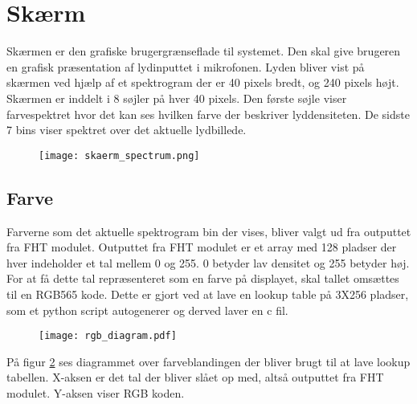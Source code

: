



\section{Skærm}
Skærmen er den grafiske brugergrænseflade til systemet. Den skal give brugeren en grafisk præsentation af lydinputtet i mikrofonen. Lyden bliver vist på skærmen ved hjælp af et spektrogram der er 40 pixels bredt, og 240 pixels højt.
Skærmen er inddelt i 8 søjler på hver 40 pixels. Den første søjle viser farvespektret hvor det kan ses hvilken farve der beskriver lyddensiteten. De sidste 7 bins viser spektret over det aktuelle lydbillede.

\begin{figure} [H]
	\centering
	\texttt{[image: skaerm\_spectrum.png]}
	\label{fig:skaerm_spectrum}
\end{figure}

\subsection{Farve}
Farverne som det aktuelle spektrogram bin der vises, bliver valgt ud fra outputtet fra FHT modulet. Outputtet fra FHT modulet er et array med 128 pladser der hver indeholder et tal mellem 0 og 255. 0 betyder lav densitet og 255 betyder høj.
For at få dette tal repræsenteret som en farve på displayet, skal tallet omsættes til en RGB565 kode.
Dette er gjort ved at lave en lookup table på 3X256 pladser, som et python script autogenerer og derved laver en c fil.

\begin{figure} [H]
	\centering
	\texttt{[image: rgb\_diagram.pdf]}
	\label{fig:rgb_diagram}
\end{figure}


På figur \ref{fig:rgb_diagram} ses diagrammet over farveblandingen der bliver brugt til at lave lookup tabellen. X-aksen er det tal der bliver slået op med, altså outputtet fra FHT modulet. Y-aksen viser RGB koden.




